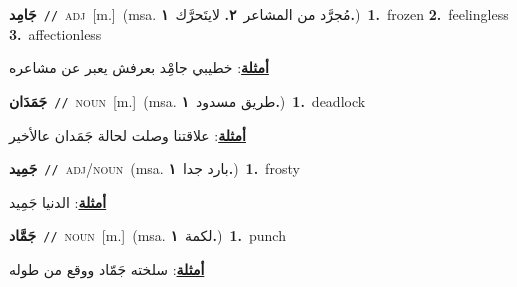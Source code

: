 \documentclass[10pt,a4paper,twoside]{article} %
\begin{document}
\begin{multicols}{2}
{\setlength\topsep{0pt}\textbf{\foreignlanguage{arabic}{جَامِد}}\ {\color{gray}\texttt{//}\color{black}}\ \textsc{adj}\ [m.]\ \color{gray}(msa. \foreignlanguage{arabic}{مُجرَّد من المشاعر}~\foreignlanguage{arabic}{\textbf{٢.}}  \foreignlanguage{arabic}{لايتَحرَّك}~\foreignlanguage{arabic}{\textbf{١.}})\color{black}\ \textbf{1.}~frozen  \textbf{2.}~feelingless  \textbf{3.}~affectionless\  \begin{flushright}\color{gray}\foreignlanguage{arabic}{\textbf{\underline{\foreignlanguage{arabic}{أمثلة}}}: خطيبي جامِْد بعرفش يعبر عن مشاعره}\end{flushright}\color{black}} \vspace{2mm}

{\setlength\topsep{0pt}\textbf{\foreignlanguage{arabic}{جَمَدَان}}\ {\color{gray}\texttt{//}\color{black}}\ \textsc{noun}\ [m.]\ \color{gray}(msa. \foreignlanguage{arabic}{طريق مسدود}~\foreignlanguage{arabic}{\textbf{١.}})\color{black}\ \textbf{1.}~deadlock\  \begin{flushright}\color{gray}\foreignlanguage{arabic}{\textbf{\underline{\foreignlanguage{arabic}{أمثلة}}}: علاقتنا وصلت لحالة جَمَدان عالأخير}\end{flushright}\color{black}} \vspace{2mm}

{\setlength\topsep{0pt}\textbf{\foreignlanguage{arabic}{جَمِيد}}\ {\color{gray}\texttt{//}\color{black}}\ \textsc{adj/noun}\ \color{gray}(msa. \foreignlanguage{arabic}{بارد جدا}~\foreignlanguage{arabic}{\textbf{١.}})\color{black}\ \textbf{1.}~frosty\  \begin{flushright}\color{gray}\foreignlanguage{arabic}{\textbf{\underline{\foreignlanguage{arabic}{أمثلة}}}: الدنيا جَمِيد}\end{flushright}\color{black}} \vspace{2mm}

{\setlength\topsep{0pt}\textbf{\foreignlanguage{arabic}{جَمَّاد}}\ {\color{gray}\texttt{//}\color{black}}\ \textsc{noun}\ [m.]\ \color{gray}(msa. \foreignlanguage{arabic}{لكمة}~\foreignlanguage{arabic}{\textbf{١.}})\color{black}\ \textbf{1.}~punch\  \begin{flushright}\color{gray}\foreignlanguage{arabic}{\textbf{\underline{\foreignlanguage{arabic}{أمثلة}}}: سلخته جَمّاد ووقع من طوله}\end{flushright}\color{black}} \vspace{2mm}


\end{multicols}
\end{document}
